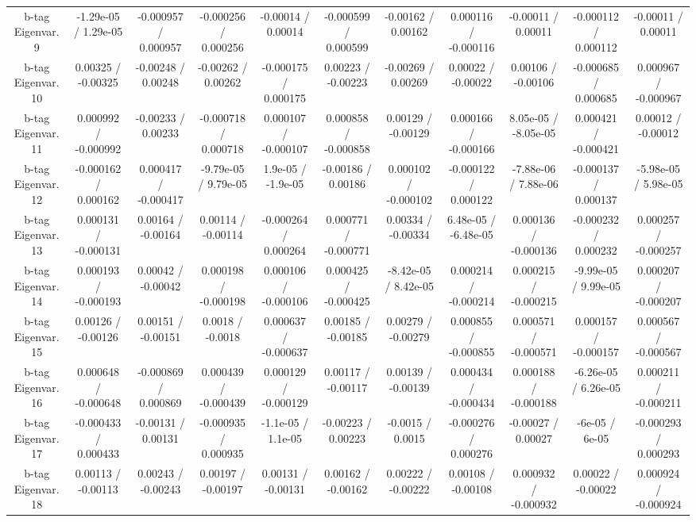 \begin{table}[htbp]
\begin{center}
\begin{tabular}{|c|c|c|c|c|c|c|c|c|c|c|}
  b-tag Eigenvar. 9 & -1.29e-05 / 1.29e-05 & -0.000957 / 0.000957 & -0.000256 / 0.000256 & -0.00014 / 0.00014 & -0.000599 / 0.000599 & -0.00162 / 0.00162 & 0.000116 / -0.000116 & -0.00011 / 0.00011 & -0.000112 / 0.000112 & -0.00011 / 0.00011 \\ 
  b-tag Eigenvar. 10 & 0.00325 / -0.00325 & -0.00248 / 0.00248 & -0.00262 / 0.00262 & -0.000175 / 0.000175 & 0.00223 / -0.00223 & -0.00269 / 0.00269 & 0.00022 / -0.00022 & 0.00106 / -0.00106 & -0.000685 / 0.000685 & 0.000967 / -0.000967 \\ 
  b-tag Eigenvar. 11 & 0.000992 / -0.000992 & -0.00233 / 0.00233 & -0.000718 / 0.000718 & 0.000107 / -0.000107 & 0.000858 / -0.000858 & 0.00129 / -0.00129 & 0.000166 / -0.000166 & 8.05e-05 / -8.05e-05 & 0.000421 / -0.000421 & 0.00012 / -0.00012 \\ 
  b-tag Eigenvar. 12 & -0.000162 / 0.000162 & 0.000417 / -0.000417 & -9.79e-05 / 9.79e-05 & 1.9e-05 / -1.9e-05 & -0.00186 / 0.00186 & 0.000102 / -0.000102 & -0.000122 / 0.000122 & -7.88e-06 / 7.88e-06 & -0.000137 / 0.000137 & -5.98e-05 / 5.98e-05 \\ 
  b-tag Eigenvar. 13 & 0.000131 / -0.000131 & 0.00164 / -0.00164 & 0.00114 / -0.00114 & -0.000264 / 0.000264 & 0.000771 / -0.000771 & 0.00334 / -0.00334 & 6.48e-05 / -6.48e-05 & 0.000136 / -0.000136 & -0.000232 / 0.000232 & 0.000257 / -0.000257 \\ 
  b-tag Eigenvar. 14 & 0.000193 / -0.000193 & 0.00042 / -0.00042 & 0.000198 / -0.000198 & 0.000106 / -0.000106 & 0.000425 / -0.000425 & -8.42e-05 / 8.42e-05 & 0.000214 / -0.000214 & 0.000215 / -0.000215 & -9.99e-05 / 9.99e-05 & 0.000207 / -0.000207 \\ 
  b-tag Eigenvar. 15 & 0.00126 / -0.00126 & 0.00151 / -0.00151 & 0.0018 / -0.0018 & 0.000637 / -0.000637 & 0.00185 / -0.00185 & 0.00279 / -0.00279 & 0.000855 / -0.000855 & 0.000571 / -0.000571 & 0.000157 / -0.000157 & 0.000567 / -0.000567 \\ 
  b-tag Eigenvar. 16 & 0.000648 / -0.000648 & -0.000869 / 0.000869 & 0.000439 / -0.000439 & 0.000129 / -0.000129 & 0.00117 / -0.00117 & 0.00139 / -0.00139 & 0.000434 / -0.000434 & 0.000188 / -0.000188 & -6.26e-05 / 6.26e-05 & 0.000211 / -0.000211 \\ 
  b-tag Eigenvar. 17 & -0.000433 / 0.000433 & -0.00131 / 0.00131 & -0.000935 / 0.000935 & -1.1e-05 / 1.1e-05 & -0.00223 / 0.00223 & -0.0015 / 0.0015 & -0.000276 / 0.000276 & -0.00027 / 0.00027 & -6e-05 / 6e-05 & -0.000293 / 0.000293 \\ 
  b-tag Eigenvar. 18 & 0.00113 / -0.00113 & 0.00243 / -0.00243 & 0.00197 / -0.00197 & 0.00131 / -0.00131 & 0.00162 / -0.00162 & 0.00222 / -0.00222 & 0.00108 / -0.00108 & 0.000932 / -0.000932 & 0.00022 / -0.00022 & 0.000924 / -0.000924 \\ 

\end{tabular}
\end{center}
\end{table}

